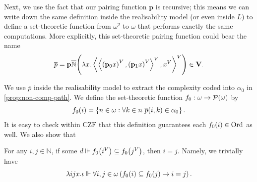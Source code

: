\documentclass[preprint]{elsarticle}
\theoremstyle{plain}
\newcommand{\tuple}[1]{\left\langle #1 \right\rangle}
\newcommand{\Ord}{\mathrm{Ord}}
\begin{document}
Next, we use the fact that our pairing function $\mathbf{p}$ is recursive; this means we can write down the same definition inside the realisability model (or even inside $L$) to define a set-theoretic function from $\omega^2$ to $\omega$ that performs exactly the same computations. More explicitly, this set-theoretic pairing function could bear the name
\[\overline{p} = \mathbf{p}\overline{\mathbb{N}} \mleft(\lambda x. \tuple{\tuple{\left(\mathbf{p}_0 x\right)^V, \left(\mathbf{p}_1 x\right)^V}^V, x^V}^V\mright) \in \mathbf{V}.\]

We use $\overline{p}$ inside the realisability model to extract the complexity coded into $\alpha_0$ in \autoref{prop:non-comp-path}. We define the set-theoretic function $f_0 : \omega \rightarrow \mathcal{P}\mleft(\omega\mright)$ by
\[f_0\mleft(i\mright) = \left\{n \in \omega : \forall k \in n \ \overline{p}\mleft(i, k\mright) \in \alpha_0\right\}.\]
It is easy to check within $\mathrm{CZF}$ that this definition guarantees each $f_0\mleft(i\mright) \in \Ord$ as well. We also show that

\begin{proposition}
  \label{prop:f-subset-eq}
  For any $i, j \in \mathbb{N}$, if some $d \Vdash f_0\mleft(i^V\mright) \subseteq f_0\mleft(j^V\mright)$, then $i = j$. Namely, we trivially have
  \[\lambda ijx. \iota \Vdash \forall i, j \in \omega \left(f_0\mleft(i\mright) \subseteq f_0\mleft(j\mright) \rightarrow i = j\right).\]
\end{proposition}
\end{document}
